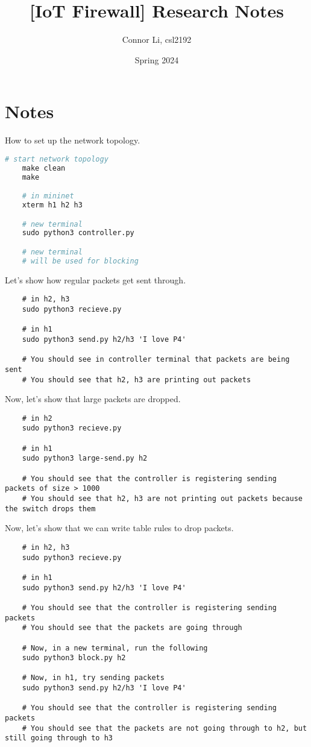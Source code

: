 \documentclass[10pt]{extarticle}
\title{[IoT Firewall] Research Notes}
\author{Connor Li, csl2192}
\date{Spring 2024}
\begin{document}
\maketitle

\section*{Notes}
How to set up the network topology.
\begin{lstlisting}[language=Python]
    # start network topology
    make clean
    make

    # in mininet
    xterm h1 h2 h3

    # new terminal
    sudo python3 controller.py

    # new terminal
    # will be used for blocking
\end{lstlisting}
Let's show how regular packets get sent through.
\begin{lstlisting}
    # in h2, h3
    sudo python3 recieve.py

    # in h1
    sudo python3 send.py h2/h3 'I love P4'

    # You should see in controller terminal that packets are being sent
    # You should see that h2, h3 are printing out packets
\end{lstlisting}
Now, let's show that large packets are dropped.
\begin{lstlisting}
    # in h2
    sudo python3 recieve.py

    # in h1
    sudo python3 large-send.py h2

    # You should see that the controller is registering sending packets of size > 1000
    # You should see that h2, h3 are not printing out packets because the switch drops them
\end{lstlisting}
Now, let's show that we can write table rules to drop packets.
\begin{lstlisting}
    # in h2, h3
    sudo python3 recieve.py

    # in h1
    sudo python3 send.py h2/h3 'I love P4'

    # You should see that the controller is registering sending packets
    # You should see that the packets are going through

    # Now, in a new terminal, run the following
    sudo python3 block.py h2

    # Now, in h1, try sending packets
    sudo python3 send.py h2/h3 'I love P4'

    # You should see that the controller is registering sending packets
    # You should see that the packets are not going through to h2, but still going through to h3
\end{lstlisting}
\end{document}
